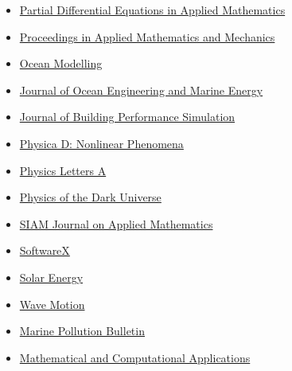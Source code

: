 \documentclass[final, a4paper, oneside, 12pt]{article}
\numberwithin{equation}{section}
\begin{document}
\begin{itemize}
    \item \href{https://www.sciencedirect.com/journal/partial-differential-equations-in-applied-mathematics/}%
    {Partial Differential Equations in Applied Mathematics}

    \item \href{https://onlinelibrary.wiley.com/journal/16177061/}%
    {Proceedings in Applied Mathematics and Mechanics}
    
    \item \href{http://www.elsevier.com/wps/find/journaldescription.cws_home/601376/description#description}%
    {Ocean Modelling}
    
    \item \href{http://www.springer.com/engineering/civil+engineering/journal/40722/}%
    {Journal of Ocean Engineering and Marine Energy}
    
    \item \href{https://www.tandfonline.com/toc/tbps20/current/}%
    {Journal of Building Performance Simulation}

    \item \href{https://www.sciencedirect.com/journal/physica-d-nonlinear-phenomena/}%
    {Physica D: Nonlinear Phenomena}
    
    \item \href{http://www.journals.elsevier.com/physics-letters-a/}%
    {Physics Letters A}
    
    \item \href{https://www.sciencedirect.com/journal/physics-of-the-dark-universe/}%
    {Physics of the Dark Universe}
    
    \item \href{http://www.siam.org/journals/siap.php}%
    {SIAM Journal on Applied Mathematics}
    
    \item \href{https://www.sciencedirect.com/journal/softwarex/}%
    {SoftwareX}

    \item \href{https://www.sciencedirect.com/journal/solar-energy/}%
    {Solar Energy}
  
    \item \href{http://www.elsevier.com/locate/wavemoti}%
    {Wave Motion}

    \item \href{https://www.sciencedirect.com/journal/marine-pollution-bulletin/}%
    {Marine Pollution Bulletin}
    
    \item \href{https://www.mdpi.com/journal/mca}%
    {Mathematical and Computational Applications}
    

\end{itemize}
\end{document}
